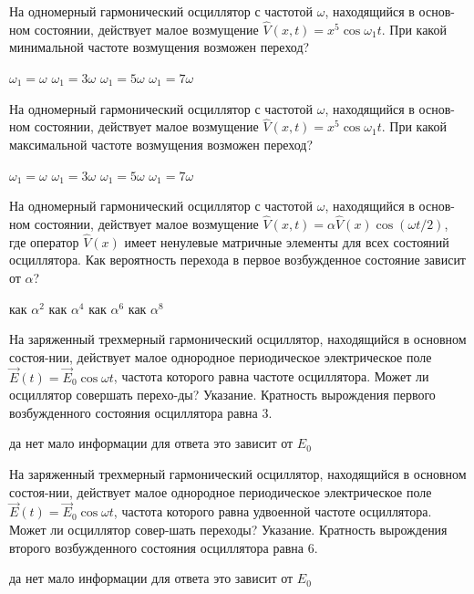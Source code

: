 \documentclass[11pt,a4paper]{exam}
\begin{document}
\begin{questions}
\question На одномерный гармонический осциллятор с частотой $\omega $, находящийся в основ-ном состоянии, действует малое возмущение $\hat V(x,t) = {x^5}\cos {\omega _1}t$. При какой минимальной частоте возмущения возможен переход? 
\begin{choices}
\choice ${\omega _1} = \omega $  
\choice ${\omega _1} = 3\omega $ 
\choice ${\omega _1} = 5\omega $ 
\choice ${\omega _1} = 7\omega $
\end{choices}

\question На одномерный гармонический осциллятор с частотой $\omega $, находящийся в основ-ном состоянии, действует малое возмущение $\hat V(x,t) = {x^5}\cos {\omega _1}t$. При какой максимальной частоте возмущения возможен переход? 
\begin{choices}
\choice ${\omega _1} = \omega $  
\choice ${\omega _1} = 3\omega $ 
\choice ${\omega _1} = 5\omega $ 
\choice ${\omega _1} = 7\omega $
\end{choices}

\question На одномерный гармонический осциллятор с частотой $\omega $, находящийся в основ-ном состоянии, действует малое возмущение $\hat V(x,t) = \alpha \hat V(x)\cos (\omega t/2)$, где оператор $\hat V(x)$ имеет ненулевые матричные элементы для всех состояний осциллятора. Как вероятность перехода в первое возбужденное состояние зависит от $\alpha $?
\begin{choices}
\choice как ${\alpha ^2}$    
\choice как ${\alpha ^4}$    
\choice как ${\alpha ^6}$    
\choice как ${\alpha ^8}$
\end{choices}

\question На заряженный трехмерный гармонический осциллятор, находящийся в основном состоя-нии, действует малое однородное периодическое электрическое поле $\vec E(t) = {\vec E_0}\cos \omega t$, частота которого равна частоте осциллятора. Может ли осциллятор совершать перехо-ды? Указание. Кратность вырождения первого возбужденного состояния осциллятора равна 3.
\begin{choices}
\choice да    
\choice нет      
\choice мало информации для ответа    
\choice это зависит от ${E_0}$
\end{choices}

\question На заряженный трехмерный гармонический осциллятор, находящийся в основном состоя-нии, действует малое однородное периодическое электрическое поле $\vec E(t) = {\vec E_0}\cos \omega t$, частота которого равна удвоенной частоте осциллятора. Может ли осциллятор совер-шать переходы? Указание. Кратность вырождения второго возбужденного состояния осциллятора равна 6.
\begin{choices}
\choice да    
\choice нет      
\choice мало информации для ответа    
\choice это зависит от ${E_0}$
\end{choices}


\end{questions}
\end{document}
